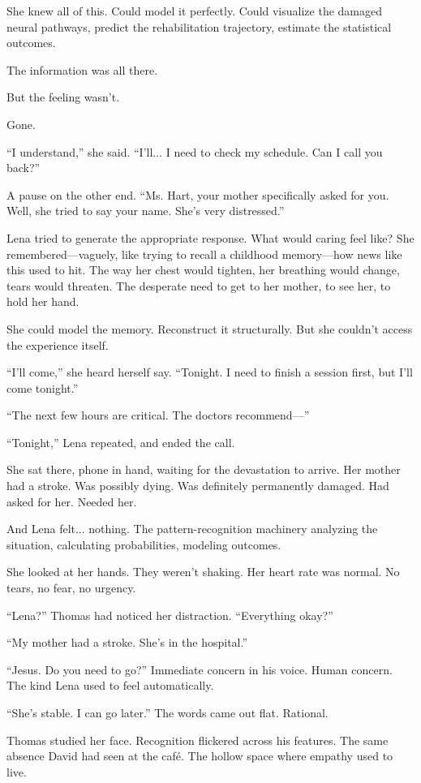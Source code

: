 She knew all of this. Could model it perfectly. Could visualize the damaged neural pathways, predict the rehabilitation trajectory, estimate the statistical outcomes.

The information was all there.

But the feeling wasn't.

Gone.

``I understand,'' she said. ``I'll... I need to check my schedule. Can I call you back?''

A pause on the other end. ``Ms. Hart, your mother specifically asked for you. Well, she tried to say your name. She's very distressed.''

Lena tried to generate the appropriate response. What would caring feel like? She remembered—vaguely, like trying to recall a childhood memory—how news like this used to hit. The way her chest would tighten, her breathing would change, tears would threaten. The desperate need to get to her mother, to see her, to hold her hand.

She could model the memory. Reconstruct it structurally. But she couldn't access the experience itself.

``I'll come,'' she heard herself say. ``Tonight. I need to finish a session first, but I'll come tonight.''

``The next few hours are critical. The doctors recommend—''

``Tonight,'' Lena repeated, and ended the call.

She sat there, phone in hand, waiting for the devastation to arrive. Her mother had a stroke. Was possibly dying. Was definitely permanently damaged. Had asked for her. Needed her.

And Lena felt... nothing. The pattern-recognition machinery analyzing the situation, calculating probabilities, modeling outcomes.

She looked at her hands. They weren't shaking. Her heart rate was normal. No tears, no fear, no urgency.

``Lena?'' Thomas had noticed her distraction. ``Everything okay?''

``My mother had a stroke. She's in the hospital.''

``Jesus. Do you need to go?'' Immediate concern in his voice. Human concern. The kind Lena used to feel automatically.

``She's stable. I can go later.'' The words came out flat. Rational.

Thomas studied her face. Recognition flickered across his features. The same absence David had seen at the café. The hollow space where empathy used to live.

